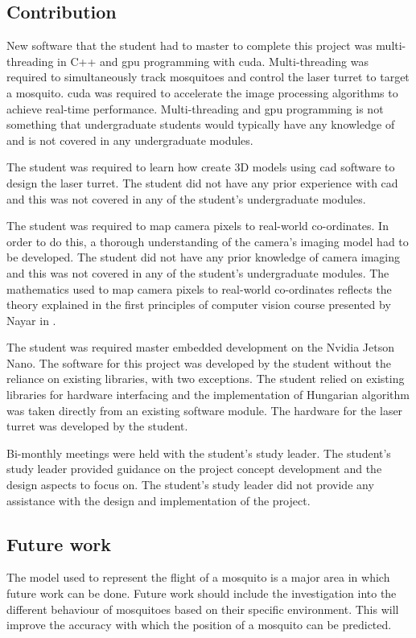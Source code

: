 \subsection{Contribution}
New software that the student had to master to complete this project was multi-threading in C++ and \gls{gpu} programming with \gls{cuda}. Multi-threading was required to simultaneously track mosquitoes and control the laser turret to target a mosquito. \gls{cuda} was required to accelerate the image processing algorithms to achieve real-time performance. Multi-threading and \gls{gpu} programming is not something that undergraduate students would typically have any knowledge of and is not covered in any undergraduate modules.

The student was required to learn how create 3D models using \gls{cad} software to design the laser turret. The student did not have any prior experience with \gls{cad} and this was not covered in any of the student's undergraduate modules.

The student was required to map camera pixels to real-world co-ordinates. In order to do this, a thorough understanding of the camera's imaging model had to be developed. The student did not have any prior knowledge of camera imaging and this was not covered in any of the student's undergraduate modules. The mathematics used to map camera pixels to real-world co-ordinates reflects the theory explained in the first principles of computer vision course presented by Nayar in \cite{Nayar}.

The student was required master embedded development on the Nvidia Jetson Nano. The software for this project was developed by the student without the reliance on existing libraries, with two exceptions. The student relied on existing libraries for hardware interfacing and the implementation of Hungarian algorithm was taken directly from an existing software module. The hardware for the laser turret was developed by the student.

Bi-monthly meetings were held with the student's study leader. The student's study leader provided guidance on the project concept development and the design aspects to focus on. The student's study leader did not provide any assistance with the design and implementation of the project.


\subsection{Future work}
The model used to represent the flight of a mosquito is a major area in which future work can be done. Future work should include the investigation into the different behaviour of mosquitoes based on their specific environment. This will improve the accuracy with which the position of a mosquito can be predicted.


